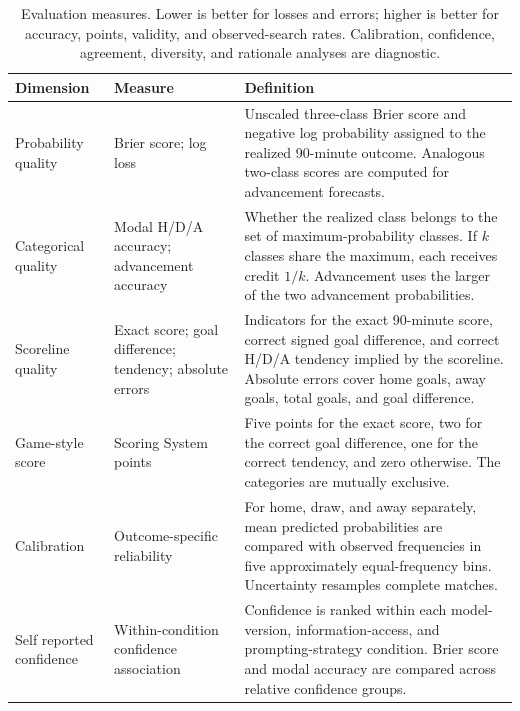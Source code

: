 \documentclass[sigconf,nonacm]{acmart}
\begin{document}
\begin{table}[t]
  \caption{Evaluation measures. Lower is better for losses and errors; higher is better for accuracy, points, validity, and observed-search rates. Calibration, confidence, agreement, diversity, and rationale analyses are diagnostic.}
  \label{tab:evaluation-metrics}
  \centering
  \scriptsize
  \begin{tabularx}{\textwidth}{>{\raggedright\arraybackslash}p{}
    >{\raggedright\arraybackslash}p{}X}
    \toprule
    \textbf{Dimension} & \textbf{Measure} & \textbf{Definition} \\
    \midrule
    Probability quality &
    Brier score; log loss &
    Unscaled three-class Brier score and negative log probability assigned to the realized 90-minute outcome. Analogous two-class scores are computed for advancement forecasts. \\

    Categorical quality &
    Modal H/D/A accuracy; advancement accuracy &
    Whether the realized class belongs to the set of maximum-probability classes. If $k$ classes share the maximum, each receives credit $1/k$. Advancement uses the larger of the two advancement probabilities. \\

    Scoreline quality &
    Exact score; goal difference; tendency; absolute errors &
    Indicators for the exact 90-minute score, correct signed goal difference, and correct H/D/A tendency implied by the scoreline. Absolute errors cover home goals, away goals, total goals, and goal difference. \\

    Game-style score &
    Scoring System points &
    Five points for the exact score, two for the correct goal difference, one for the correct tendency, and zero otherwise. The categories are mutually exclusive. \\

    Calibration &
    Outcome-specific reliability &
    For home, draw, and away separately, mean predicted probabilities are compared with observed frequencies in five approximately equal-frequency bins. Uncertainty resamples complete matches. \\

    Self reported confidence &
    Within-condition confidence association &
    Confidence is ranked within each model-version, information-access, and prompting-strategy condition. Brier score and modal accuracy are compared across relative confidence groups. \\


\end{tabularx}
\end{table}
\end{document}
